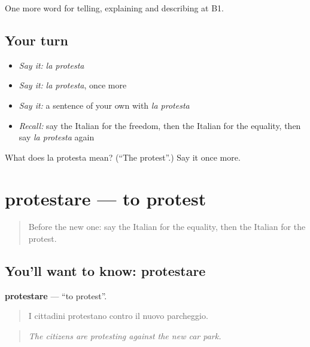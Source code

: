 \begin{grammarlens}[title={What you've built}]
One more word for telling, explaining and describing at B1.
\end{grammarlens}

\subsection*{Your turn}
\begin{itemize}
\raggedright
  \item \emph{Say it:} \emph{la protesta}
  \item \emph{Say it:} \emph{la protesta}, once more
  \item \emph{Say it:} a sentence of your own with \emph{la protesta}
  \item \emph{Recall:} say the Italian for the freedom, then the Italian for the equality, then say \emph{la protesta} again
\end{itemize}

\begin{tcolorbox}[breakable,colback=teal!4,colframe=teal!35!black,title={Before you move on}]
What does la protesta mean? (\textquotedblleft{}The protest\textquotedblright{}.) Say it once more.
\end{tcolorbox}
\section[protestare]{protestare — to protest}

\label{lesson:IT-C364-protestare}



\begin{quote}
Before the new one: say the Italian for the equality, then the Italian for the protest.
\end{quote}

\subsection*{You'll want to know: protestare}
\textbf{protestare} — \textquotedblleft{}to protest\textquotedblright{}.

\begin{quote}
I cittadini protestano contro il nuovo parcheggio.
\end{quote}

\begin{quote}
\emph{The citizens are protesting against the new car park.}
\end{quote}

